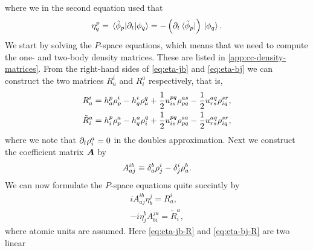            where we in the second equation used that
            \begin{align}
                \eta^{p}_{q}
                = \mel*{\tilde{\phi}_{p}}{\partial_t}{\phi_q}
                = -\left( 
                    \partial_t \bra*{\tilde{\phi}_{p}}
                 \right)\ket*{\phi_q}.
            \end{align}
            We start by solving the $P$-space equations, which means that we
            need to compute the one- and two-body density matrices.
            These are listed in \autoref{app:cc-density-matrices}.
            From the right-hand sides of \autoref{eq:eta-jb} and
            \autoref{eq:eta-bj} we can construct the two matrices $R^{i}_{a}$
            and $R^{a}_{i}$ respectively, that is,
            \begin{gather}
                R^{i}_{a}
                = h^{p}_{a}\rho^{i}_{p}
                - h^{i}_{q}\rho^{q}_{a}
                + \frac{1}{2}u^{pq}_{is}\rho^{as}_{pq}
                - \frac{1}{2}u^{aq}_{rs}\rho^{sr}_{iq},
                \\
                \tilde{R}^{a}_{i}
                =
                h^{p}_{i}\rho^{a}_{p}
                -
                h^{a}_{q}\rho^{q}_{i}
                +
                \frac{1}{2}
                u^{pq}_{is}\rho^{sa}_{pq}
                -
                \frac{1}{2}
                u^{aq}_{rs}\rho^{sr}_{iq},
            \end{gather}
            where we note that $\partial_t\rho^{a}_{i} = 0$ in the
            doubles approximation.
            Next we construct the coefficient matrix $\boldsymbol{A}$ by
            \begin{align}
                A^{ib}_{aj}
                \equiv \delta^{b}_{a}\rho^{i}_{j}
                - \delta^{i}_{j}\rho^{b}_{a}.
            \end{align}
            We can now formulate the $P$-space equations quite succintly by
            \begin{gather}
                iA^{ib}_{aj}\eta^{j}_{b} = R^{i}_{a},
                \label{eq:eta-jb-R}
                \\
                -i\eta^{b}_{j}A^{ja}_{bi} = \tilde{R}^{a}_{i},
                \label{eq:eta-bj-R}
            \end{gather}
            where atomic units are assumed.
            Here \autoref{eq:eta-jb-R} and \autoref{eq:eta-bj-R} are two linear
